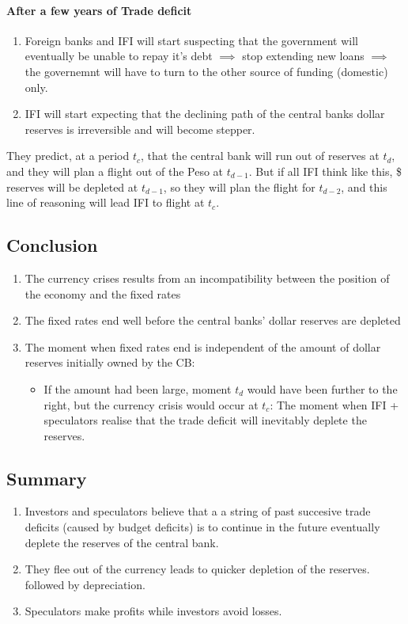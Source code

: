 \documentclass{report}
\begin{document}
\paragraph{After a few years of Trade deficit}
\begin{enumerate}
    \item Foreign banks and IFI will start suspecting that the government will eventually be unable to repay it's debt $\implies$ stop extending new loans $\implies$ the governemnt will have to turn to the other source of funding (domestic) only.
    \item IFI will start expecting that the declining path of the central banks dollar reserves is irreversible and will become stepper.
\end{enumerate}

They predict, at a period $t_c$, that the central bank will run out of reserves at $t_d$, and they will plan a flight out of the Peso at $t_{d-1}$. But if all IFI think like this, \$ reserves will be depleted at $t_{d-1}$, so they will plan the flight for $t_{d-2}$, and this line of reasoning will lead IFI to flight at $t_c$.


\subsection{Conclusion}
\begin{enumerate}
    \item The currency crises results from an incompatibility between the position of the economy and the fixed rates
    \item The fixed rates end well before the central banks' dollar reserves are depleted
    \item The moment when fixed rates end is independent of the amount of dollar reserves initially owned by the CB: 
    \begin{itemize}
        \item If the amount had been large, moment $t_d$ would have been further to the right, but the currency crisis would occur at $t_c$:
        The moment when IFI + speculators realise that the trade deficit will inevitably deplete the reserves. 
    \end{itemize}
\end{enumerate}

\subsection{Summary}
\begin{enumerate}
    \item Investors and speculators believe that a a string of past succesive trade deficits (caused by budget deficits) is to continue in the future eventually deplete the reserves of the central bank.
    \item They flee out of the currency leads to quicker depletion of the reserves. followed by depreciation. 
    \item Speculators make profits while investors avoid losses. 
\end{enumerate}
\end{document}
